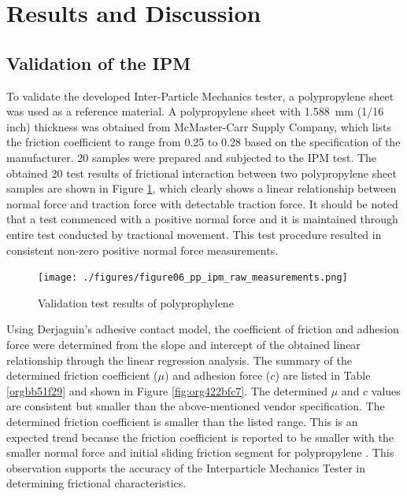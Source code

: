 \documentclass[xcolor=dvipsnames,10pt,hidelinks]{article}
\let\oldsubsection\subsection
\renewcommand{\subsection}{\clearpage\oldsubsection}
\begin{document}
\section{Results and Discussion}
\label{sec:org59b1bca}
\subsection{Validation of the IPM}
\label{sec:org33a26c4}
To validate the developed Inter-Particle Mechanics tester, a polypropylene sheet was used as a reference material.
A polypropylene sheet with \qty{1.588}{\milli\meter} (1/16 inch) thickness was obtained from McMaster-Carr Supply Company,
which lists the friction coefficient to range from 0.25 to 0.28 based on the specification of the manufacturer.
20 samples were prepared and subjected to the IPM test.
The obtained 20 test results of frictional interaction between two polypropylene sheet samples are shown in Figure \ref{fig:orgf7bd77f},
which clearly shows a linear relationship between normal force and traction force with detectable traction force.
It should be noted that a test commenced with a positive normal force and it is maintained through entire test conducted by tractional movement.
This test procedure resulted in consistent non-zero positive normal force measurements.

\begin{figure}[htbp]
\centering
\texttt{[image: ./figures/figure06\_pp\_ipm\_raw\_measurements.png]}
\caption{\label{fig:orgf7bd77f}Validation test results of polyprophylene}
\end{figure}

Using Derjaguin's adhesive contact model,
the coefficient of friction and adhesion force were determined from the slope and intercept of the obtained linear relationship through the linear regression analysis. The summary of the determined friction coefficient (\(\mu\)) and adhesion force (\(c\)) are listed in Table \ref{orgbb51f29} and shown in Figure \ref{fig:org422bfc7}.
The determined \(\mu\) and \(c\) values are consistent but smaller than the above-mentioned vendor specification.
The determined friction coefficient is smaller than the listed range.
This is an expected trend because the friction coefficient is reported to be smaller with the smaller normal force and initial sliding friction segment for polypropylene \parencite{gracias_continuum_1998,sedlak_effect_2017}.
This observation supports the accuracy of the Interparticle Mechanics Tester in determining frictional characteristics.
\end{document}
